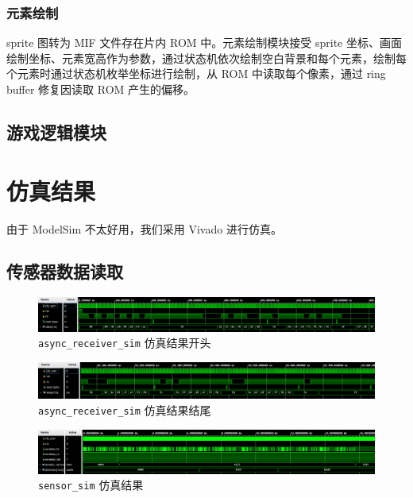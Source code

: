 \documentclass[UTF8, 11pt, fontset=none]{ctexart}
\begin{document}
\subsubsection{元素绘制}

sprite 图转为 MIF 文件存在片内 ROM 中。元素绘制模块接受 sprite 坐标、画面绘制坐标、元素宽高作为参数，通过状态机依次绘制空白背景和每个元素，绘制每个元素时通过状态机枚举坐标进行绘制，从 ROM 中读取每个像素，通过 ring buffer 修复因读取 ROM 产生的偏移。

\subsection{游戏逻辑模块}

\section{仿真结果}

由于 ModelSim 不太好用，我们采用 Vivado 进行仿真。

\subsection{传感器数据读取}

\begin{figure}[H]
    \centering
    \includegraphics[width=\textwidth]{images/uart-sim-begin.png}
    \vspace{-16pt}
    \caption{\texttt{async_receiver_sim} 仿真结果开头}
\end{figure}

\begin{figure}[H]
    \centering
    \includegraphics[width=\textwidth]{images/uart-sim-end.png}
    \vspace{-16pt}
    \caption{\texttt{async_receiver_sim} 仿真结果结尾}
\end{figure}

\begin{figure}[H]
    \centering
    \includegraphics[width=\textwidth]{images/sensor-sim.png}
    \vspace{-16pt}
    \caption{\texttt{sensor_sim} 仿真结果}
\end{figure}
\end{document}
